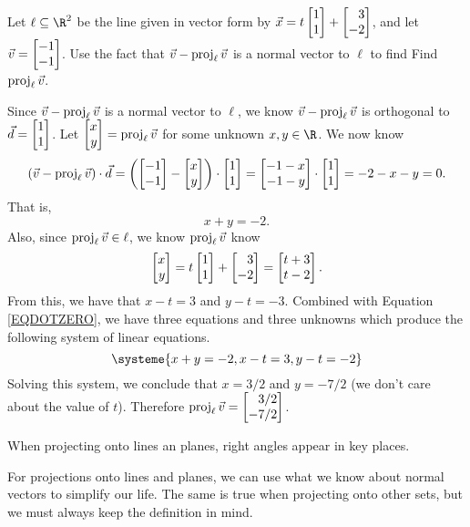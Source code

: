 \begin{example}
	Let $\ell\subseteq \R^2$ be the line given in vector form by $\vec x=t\mat{1\\1}+\mat{3\\-2}$,
	and let $\vec v=\mat{-1\\-1}$. Use the fact that $\vec v-\operatorname{proj}_\ell\vec v$ is a normal vector to $\ell$
	to find Find $\operatorname{proj}_\ell \vec v$.

	Since $\vec v-\operatorname{proj}_\ell\vec v$ is a normal vector to $\ell$, we know $\vec v-\operatorname{proj}_\ell\vec v$ is orthogonal to $\vec d=\mat{1\\1}$. 
	Let $\mat{x\\y}=\Proj_\ell\vec v$ for some unknown $x,y\in\R$. We now know
	\[
		(\vec v-\Proj_\ell\vec v)\cdot\vec d=\left(\mat{-1\\-1}-\mat{x\\y}\right)\cdot\mat{1\\1}
		=\mat{-1-x\\-1-y}\cdot \mat{1\\1}=-2-x-y=0.
	\]
	That is, 
	\begin{equation}
	\label{EQDOTZERO}
	    x+y=-2.
	\end{equation}
	Also, since $\operatorname{proj}_\ell\vec v\in\ell$, we know $\operatorname{proj}_\ell\vec v$ know
	\[
    		\mat{x\\y}=t\mat{1\\1}+\mat{3\\-2}=\mat{t+3\\t-2}.
	\]
	From this, we have that $x-t=3$ and $y-t=-3$. Combined with Equation \eqref{EQDOTZERO}, we have
	three equations and three unknowns which produce the following system of linear equations.
	\[
		\systeme{x+y=-2,x-t=3,y-t=-2}
	\]
	Solving this system, we conclude that $x=3/2$ and $y=-7/2$ (we don't care about the value of $t$). Therefore
	 $\Proj_\ell\vec v = \mat{3/2\\-7/2}$. 
\end{example}

\begin{emphbox}[Takeaway]
	When projecting onto lines an planes, right angles appear in key places.
\end{emphbox}

For projections onto lines and planes, we can use what we know about normal vectors to simplify our life.
The same is true when projecting onto other sets, but we must always keep the definition in mind.

